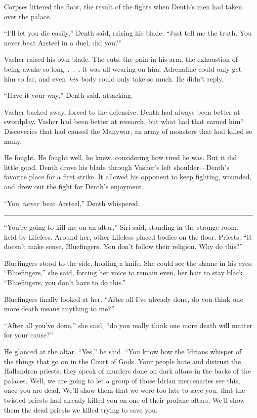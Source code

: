 Corpses littered the floor, the result of the fights when Denth’s men had taken over the palace.

“I’ll let you die easily,” Denth said, raising his blade. “Just tell me the truth. You never beat Arsteel in a duel, did you?”

Vasher raised his own blade. The cuts, the pain in his arm, the exhaustion of being awake so long~.~.~. it was all wearing on him. Adrenaline could only get him so far, and even~\textit{his}~body could only take so much. He didn’t reply.

“Have it your way,” Denth said, attacking.

Vasher backed away, forced to the defensive. Denth had always been better at swordplay. Vasher had been better at research, but what had that earned him? Discoveries that had caused the Manywar, an army of monsters that had killed so many.

He fought. He fought well, he knew, considering how tired he was. But it did little good. Denth drove his blade through Vasher’s left shoulder—Denth’s favorite place for a first strike. It allowed his opponent to keep fighting, wounded, and drew out the fight for Denth’s enjoyment.

“You~\textit{never}~beat Arsteel,” Denth whispered.

\bigskip \hrule \bigskip

“You’re going to kill me on an altar,” Siri said, standing in the strange room, held by Lifeless. Around her, other Lifeless placed bodies on the floor. Priests. “It doesn’t make sense, Bluefingers. You don’t follow their religion. Why do this?”

Bluefingers stood to the side, holding a knife. She could see the shame in his eyes. “Bluefingers,” she said, forcing her voice to remain even, her hair to stay black. “Bluefingers, you don’t have to do this.”

Bluefingers finally looked at her. “After all I’ve already done, do you think one more death means anything to me?”

“After all you’ve done,” she said, “do you really think one more death will matter for your cause?”

He glanced at the altar. “Yes,” he said. “You know how the Idrians whisper of the things that go on in the Court of Gods. Your people hate and distrust the Hallandren priests; they speak of murders done on dark altars in the backs of the palaces. Well, we are going to let a group of those Idrian mercenaries see this, once you are dead. We’ll show them that we were too late to save you, that the twisted priests had already killed you on one of their profane altars. We’ll show them the dead priests we killed trying to save you.

